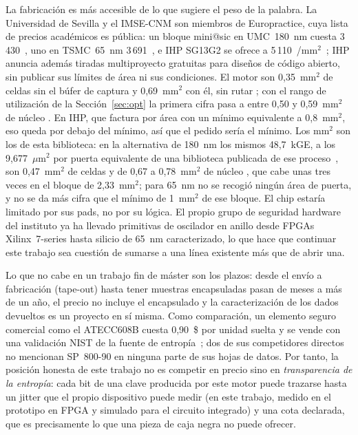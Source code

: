 La fabricación es más accesible de lo que sugiere el peso de la palabra. La
Universidad de Sevilla y el IMSE-CNM son miembros de Europractice, cuya
lista de precios académicos es pública: un bloque mini@sic en UMC~180~nm
cuesta 3\,430~\texteuro{}, uno en TSMC~65~nm 3\,691~\texteuro{}, e IHP SG13G2
se ofrece a 5\,110~\texteuro{}/mm$^2$~\cite{europractice_prices2026}; IHP
anuncia además tiradas multiproyecto gratuitas para diseños de código
abierto, sin publicar sus límites de área ni sus condiciones.
El motor son 0,35~mm$^2$ de celdas sin el búfer de captura y 0,69~mm$^2$
con él, sin rutar \simu{}; con el rango de utilización de la
Sección~\ref{sec:opt} la primera cifra pasa a entre 0,50 y 0,59~mm$^2$
de núcleo \est{}. En IHP, que factura por área con un mínimo equivalente
a 0,8~mm$^2$, eso queda por debajo del mínimo, así que el pedido sería
el mínimo. Los mm$^2$ son los de esta biblioteca: en la alternativa de
180~nm los mismos 48,7~kGE, a los 9,677~$\mu\mathrm{m}^2$ por puerta
equivalente de una biblioteca publicada de ese
proceso~\cite{poschmann2009lightweight}, son 0,47~mm$^2$ de celdas y de
0,67 a 0,78~mm$^2$ de núcleo \est{}, que cabe unas tres veces en el
bloque de 2,33~mm$^2$; para 65~nm no se recogió ningún área de puerta, y
no se da más cifra que el mínimo de 1~mm$^2$ de ese bloque. El chip
estaría limitado por sus pads, no por su
lógica. El propio grupo de seguridad hardware del instituto ya ha llevado
primitivas de oscilador en anillo desde FPGAs Xilinx~7-series hasta silicio
de 65~nm caracterizado, lo que hace que continuar este trabajo sea cuestión
de sumarse a una línea existente más que de abrir una.

Lo que no cabe en un trabajo fin de máster son los plazos: desde el envío a
fabricación (tape-out) hasta tener muestras encapsuladas pasan de meses a
más de un año, el precio no incluye el encapsulado y la caracterización de
los dados devueltos es un proyecto en sí misma. Como comparación, un
elemento seguro comercial como el ATECC608B cuesta 0,90~\$ por unidad suelta
y se vende con una validación NIST de la fuente de entropía~\cite{microchip_atecc608b_ds};
dos de sus competidores directos no mencionan SP~800-90 en ninguna parte de
sus hojas de datos. Por tanto, la posición honesta de este trabajo no es
competir en precio sino en \emph{transparencia de la entropía}: cada bit de
una clave producida por este motor puede trazarse hasta un jitter que el propio dispositivo puede medir (en
este trabajo, medido en el prototipo en \ac{FPGA} y simulado para el
circuito integrado) y
una cota declarada, que es precisamente lo que una pieza de caja negra no
puede ofrecer.
